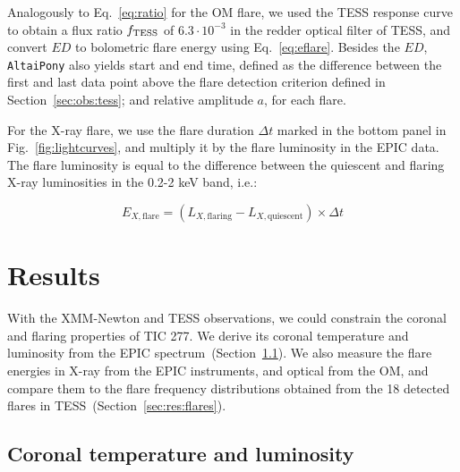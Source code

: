 \documentclass[twocolumn]{aastex631}
\begin{document}
Analogously to Eq.~\ref{eq:ratio} for the OM flare, we used the TESS response curve to obtain a flux ratio $f_{\rm TESS}$ of $6.3\cdot10^{-3}$ in the redder optical filter of TESS, and convert $ED$ to bolometric flare energy using Eq.~\ref{eq:eflare}. Besides the $ED$, \texttt{AltaiPony} also yields start and end time, defined as the difference between the first and last data point above the flare detection criterion defined in Section~\ref{sec:obs:tess}; and relative amplitude $a$, for each flare.

For the X-ray flare, we use the flare duration $\Delta t$ marked in the bottom panel in Fig.~\ref{fig:lightcurves}, and multiply it by the flare luminosity in the EPIC data. The flare luminosity is equal to the difference between the quiescent and flaring X-ray luminosities in the 0.2-2 keV band, i.e.:

\begin{equation}
    E_{X, \mathrm{flare}} = \left(L_{X,\mathrm{flaring}} -  L_{X,\mathrm{quiescent}}\right) \times \Delta t
    \label{eq:xrayflare}
\end{equation}

\section{Results}
\label{sec:results}
With the XMM-Newton and TESS observations, we could constrain the coronal and flaring properties of TIC 277. We derive its coronal temperature and luminosity from the EPIC spectrum~(Section~\ref{sec:res:XrayTL}). We also measure the flare energies in X-ray from the EPIC instruments, and optical from the OM, and compare them to the flare frequency distributions obtained from the 18 detected flares in TESS~(Section~\ref{sec:res:flares}).


\subsection{Coronal temperature and luminosity}
\label{sec:res:XrayTL}
\end{document}
